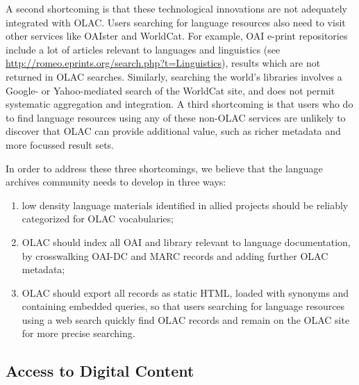 A second shortcoming is that these technological innovations are
not adequately integrated with OLAC.  Users searching for language
resources also need to visit other services like OAIster and WorldCat.
For example, OAI e-print repositories include a lot of articles
relevant to languages and linguistics (see
\url{http://romeo.eprints.org/search.php?t=Linguistics}),
results which are not returned in OLAC searches.
Similarly, searching the world's libraries involves a Google-
or Yahoo-mediated search of the WorldCat site, and does not
permit systematic aggregation and integration.
A third shortcoming is that users who do to find language resources
using any of these non-OLAC services are unlikely to discover that
OLAC can provide additional value, such as richer metadata and more
focussed result sets.


In order to address these three shortcomings, we believe that the
language archives community needs to develop in three ways:

\begin{enumerate}
\item low density language materials identified in allied projects
      should be reliably categorized for OLAC vocabularies;
\item OLAC should index all OAI and library relevant to language
      documentation, by crosswalking OAI-DC and MARC records and
      adding further OLAC metadata;
\item OLAC should export all records as static HTML, loaded with
      synonyms and containing embedded queries, so that
      users searching for language resources using a web search
      quickly find OLAC records and remain on the OLAC site for
      more precise searching.
\end{enumerate}



\vspace{1in}

\subsection{Access to Digital Content}

\vspace{1in}

